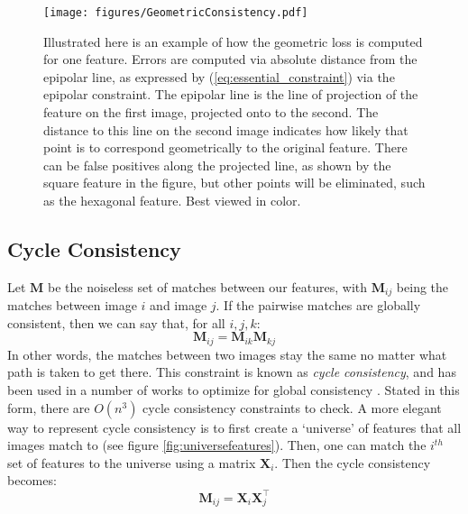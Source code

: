 \documentclass[10pt,twocolumn,letterpaper]{article}
\newcommand{\mat}[1]{\mathbf{#1}}
\begin{document}
\begin{figure}[t]
\begin{center}
  \texttt{[image: figures/GeometricConsistency.pdf]}
\end{center}
  \caption{
    Illustrated here is an example of how the geometric loss is computed for one feature.  
    Errors are computed via absolute distance from the epipolar line, as expressed by (\ref{eq:essential_constraint}) via the epipolar constraint.
    The epipolar line is the line of projection of the feature on the first image, projected onto to the second.
    The distance to this line on the second image indicates how likely that point is to correspond geometrically to the original feature.
    There can be false positives along the projected line, as shown by the square feature in the figure, but other points will be eliminated, such as the hexagonal feature.
    Best viewed in color.
  }
\label{fig:geoconsist}
\label{fig:onecol}
\end{figure}

\subsection{Cycle Consistency}

Let $\mat{M}$ be the noiseless set of matches between our features, with $\mat{M}_{ij}$ being the matches between image $i$ and image $j$.
If the pairwise matches are globally consistent, then we can say that, for all $i, j, k$:
\begin{equation}
\mat{M}_{ij} = \mat{M}_{ik} \mat{M}_{kj}
\label{eq:cycconsist1}
\end{equation}
In other words, the matches between two images stay the same no matter what path is taken to get there. 
This constraint is known as \textit{cycle consistency}, and has been used in a number of works to optimize for global consistency \cite{zhou2015multi, wang2017multi, leonardos2016distributed}.
Stated in this form, there are $O(n^3)$ cycle consistency constraints to check.
A more elegant way to represent cycle consistency is to first create a `universe' of features that all images match to (see figure \ref{fig:universefeatures}).
Then, one can match the $i^{th}$ set of features to the universe using a matrix $\mat{X}_i$.
Then the cycle consistency becomes:
\begin{equation}
\mat{M}_{ij} = \mat{X}_{i}\mat{X}_{j}^\top
\label{eq:cycconsist2}
\end{equation}
\end{document}
